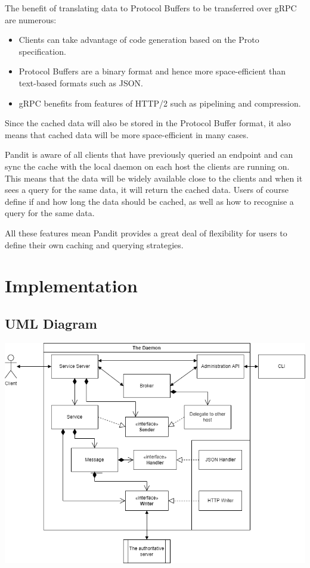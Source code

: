 \documentclass[a4paper]{article}
\begin{document}
The benefit of translating data to Protocol Buffers to be transferred over gRPC are numerous:
\begin{itemize}
    \item Clients can take advantage of code generation based on the Proto specification. \cite{codegen}
    \item Protocol Buffers are a binary format and hence more space-efficient than text-based formats such as JSON. \cite{encoding}
    \item gRPC benefits from features of HTTP/2 such as pipelining and compression. \cite{http2}
\end{itemize}

Since the cached data will also be stored in the Protocol Buffer format, it also means that cached data will be more space-efficient in
many cases.

Pandit is aware of all clients that have previously queried an endpoint and can sync the cache with the local daemon on each host the
clients are running on.
This means that the data will be widely available close to the clients and when it sees a query for the same data, it will return the cached data.
Users of course define if and how long the data should be cached, as well as how to recognise a query for the same data.

All these features mean Pandit provides a great deal of flexibility for users to define their own caching and querying strategies.

\section{Implementation}
\subsection{UML Diagram}
\includegraphics[scale=0.45]{uml}
\end{document}

